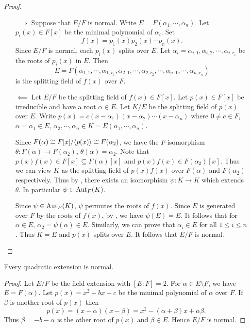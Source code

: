\documentclass[11pt]{article}
\begin{document}
\begin{proof}\,
    \begin{itemize}
        \item[$\implies$] Suppose that $E/F$ is normal. Write $E=F(\alpha_1,\cdots,\alpha_n)$. Let $p_i(x)\in F[x]$ be the minimal polynomial of $\alpha_i$. Set
        \[f(x)=p_1(x)p_2(x)\cdots p_n(x).\]
        Since $E/F$ is normal, each $p_i(x)$ splits over $E$. Let $\alpha_i=\alpha_{i,1},\alpha_{i,2},\cdots,\alpha_{i,r_i}$ be the roots of $p_i(x)$ in $E$. Then
        \[E=F(\alpha_{1,1},\cdots,\alpha_{1,r_1},\alpha_{2,1},\cdots,\alpha_{2,r_2},\cdots,\alpha_{n,1},\cdots,\alpha_{n,r_n})\]
        is the splitting field of $f(x)$ over $F$.

        \item[$\impliedby$] Let $E/F$ be the splitting field of $f(x)\in F[x]$. Let $p(x)\in F[x]$ be irreducible and have a root $\alpha\in E$. Let $K/E$ be the splitting field of $p(x)$ over $E$. Write $p(x)=c(x-\alpha_1)(x-\alpha_2)\cdots(x-\alpha_n)$ where $0\neq c\in F$, $\alpha=\alpha_1\in E$, $\alpha_2,\cdots,\alpha_n\in K=E(\alpha_1,\cdots,\alpha_n)$.

        Since $F(\alpha)\cong F[x]/\langle p(x)\rangle\cong F(\alpha_2)$, we have the $F$-isomorphism $\theta:F(\alpha)\to F(\alpha_2)$, $\theta(\alpha)=\alpha_2$. Note that $p(x)f(x)\in F[x]\subseteq F(\alpha)[x]$ and $p(x)f(x)\in F(\alpha_2)[x]$. Thus we can view $K$ as the splitting field of $p(x)f(x)$ over $F(\alpha)$ and $F(\alpha_2)$ respectively. Thus by , there exists an isomorphism $\psi:K\to K$ which extends $\theta$. In particular $\psi\in\operatorname{Aut}_F(K)$.

        Since $\psi\in\operatorname{Aut}_F(K)$, $\psi$ permutes the roots of $f(x)$. Since $E$ is generated over $F$ by the roots of $f(x)$, by , we have $\psi(E)=E$. It follows that for $\alpha\in E$, $\alpha_2=\psi(\alpha)\in E$. Similarly, we can prove that $\alpha_i\in E$ for all $1\leq i\leq n$. Thus $K=E$ and $p(x)$ splits over $E$. It follows that $E/F$ is normal.
    \end{itemize}
\end{proof}

\begin{example}
    Every quadratic extension is normal.
\end{example}

\begin{proof}
    Let $E/F$ be the field extension with $[E:F]=2$. For $\alpha\in E\setminus F$, we have $E=F(\alpha)$. Let $p(x)=x^2+bx+c$ be the minimal polynomial of $\alpha$ over $F$. If $\beta$ is another root of $p(x)$ then
    \[p(x)=(x-\alpha)(x-\beta)=x^2-(\alpha+\beta)x+\alpha\beta.\]
    Thus $\beta=-b-\alpha$ is the other root of $p(x)$ and $\beta\in E$. Hence $E/F$ is normal.
\end{proof}
\end{document}
